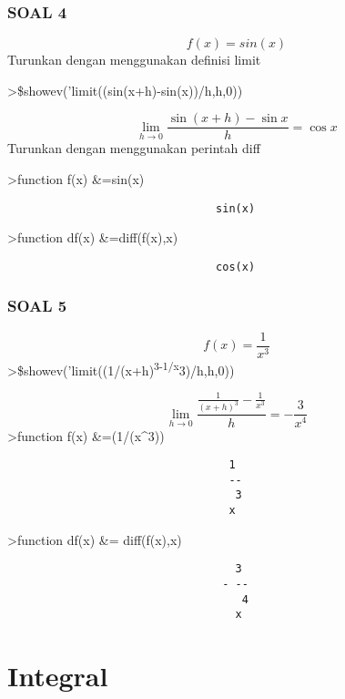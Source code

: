 \documentclass[
]{book}
\begin{document}
\subsubsection{SOAL 4}\label{soal-4}

\[f(x)=sin(x)\]Turunkan dengan menggunakan definisi limit

\textgreater\$showev('limit((sin(x+h)-sin(x))/h,h,0))

\[\lim_{h\rightarrow 0}{\frac{\sin \left(x+h\right)-\sin x}{h}}=\cos   x\]Turunkan dengan menggunakan perintah diff

\textgreater function f(x) \&=sin(x)

\begin{verbatim}
                                sin(x)
\end{verbatim}

\textgreater function df(x) \&=diff(f(x),x)

\begin{verbatim}
                                cos(x)
\end{verbatim}

\subsubsection{SOAL 5}\label{soal-5}

\[f(x) = \frac 1{x^3}\]\textgreater\$showev('limit((1/(x+h)\textsuperscript{3-1/x}3)/h,h,0))

\[\lim_{h\rightarrow 0}{\frac{\frac{1}{\left(x+h\right)^3}-\frac{1}{x  ^3}}{h}}=-\frac{3}{x^4}\]\textgreater function f(x) \&=(1/(x\^{}3))

\begin{verbatim}
                                  1
                                  --
                                   3
                                  x
\end{verbatim}

\textgreater function df(x) \&= diff(f(x),x)

\begin{verbatim}
                                   3
                                 - --
                                    4
                                   x
\end{verbatim}

\section{Integral}\label{integral}
\end{document}

